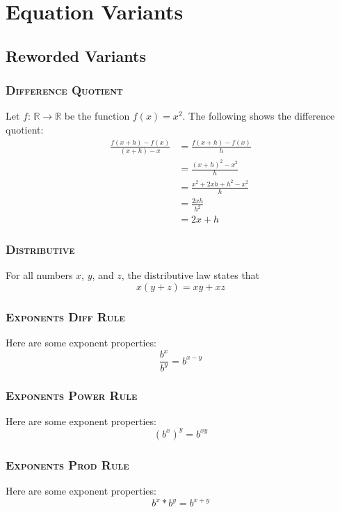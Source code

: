 \documentclass{article}
\begin{document}
\section{Equation Variants}\label{app:variants}

\subsection{Reworded Variants}
\subsubsection{\textsc{Difference Quotient}}
Let $f$: $\mathbb{R}\rightarrow\mathbb{R}$ be the function $f(x) = x^2$. The following shows the difference quotient:\begin{align*}\frac{f(x + h) - f(x)}{(x + h)-x} &= \frac{f(x + h) - f(x)}{h}\\&= \frac{(x + h)^2 - x^2}{h}\\&= \frac{x^2 + 2xh + h^2 - x^2}{h}\\&= \frac{2xh}{h^2}\\&= 2x + h
\end{align*}
\subsubsection{\textsc{Distributive}}
For all numbers $x$, $y$, and $z$, the distributive law states that \begin{equation*}x(y+z) = xy + xz
\end{equation*}
\subsubsection{\textsc{Exponents Diff Rule}}
Here are some exponent properties:\begin{equation*}\frac{b^x}{b^y} = b^{x-y}
\end{equation*}
\subsubsection{\textsc{Exponents Power Rule}}
Here are some exponent properties:\begin{equation*}(b^x)^y = b^{xy}
\end{equation*}
\subsubsection{\textsc{Exponents Prod Rule}}
Here are some exponent properties:\begin{equation*}b^x * b^y = b^{x+y}
\end{equation*}
\end{document}
